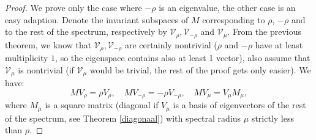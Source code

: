 \documentclass[a4paper,11pt]{report}
\begin{document}
\begin{proof}
  We prove only the case where $-\rho$ is an eigenvalue, the other case is an 
  easy adaption. Denote the invariant subspaces of $M$ corresponding to $\rho$, 
  $-\rho$ and to the rest of the spectrum, respectively by $\mathcal{V}_\rho, \mathcal{V}_{-\rho}$ 
  and $\mathcal{V}_\mu$. From the previous theorem, we know that $\mathcal{V}_\rho, \mathcal{V}_{-\rho}$  
  are certainly nontrivial ($\rho$ and $-\rho$ have at least multiplicity $1$, so the eigenspace contains also at least
  1 vector), also assume that $\mathcal{V}_\mu$ is nontrivial (if $\mathcal{V}_\mu$ would be trivial, the rest of the proof
  gets only easier). We have:
  $$MV_\rho = \rho V_\rho, \quad MV_{-\rho} = -\rho V_{-\rho}, \quad MV_\mu = V_\mu M_\mu,$$
  where $M_\mu$ is a square matrix (diagonal if $V_\mu$ is a basis of eigenvectors of the rest of the spectrum, see Theorem
  \ref{diagonaal}) with spectral radius $\mu$ strictly less than $\rho$. 
  

\end{proof}
\end{document}
